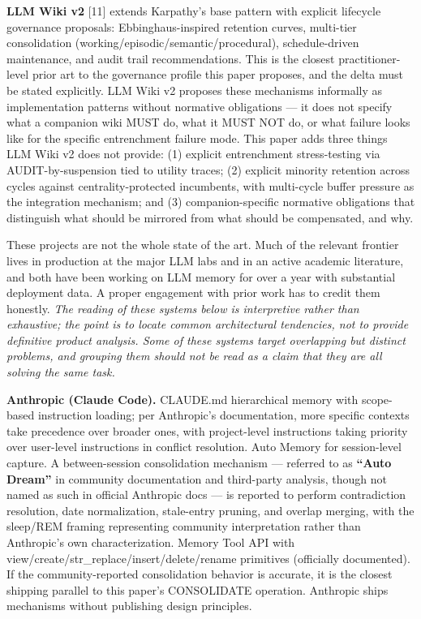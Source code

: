 \documentclass[
  11pt,
]{article}
\begin{document}
\textbf{LLM Wiki v2} {[}11{]} extends Karpathy's base pattern with
explicit lifecycle governance proposals: Ebbinghaus-inspired retention
curves, multi-tier consolidation (working/episodic/semantic/procedural),
schedule-driven maintenance, and audit trail recommendations. This is
the closest practitioner-level prior art to the governance profile this
paper proposes, and the delta must be stated explicitly. LLM Wiki v2
proposes these mechanisms informally as implementation patterns without
normative obligations --- it does not specify what a companion wiki MUST
do, what it MUST NOT do, or what failure looks like for the specific
entrenchment failure mode. This paper adds three things LLM Wiki v2 does
not provide: (1) explicit entrenchment stress-testing via
AUDIT-by-suspension tied to utility traces; (2) explicit minority
retention across cycles against centrality-protected incumbents, with
multi-cycle buffer pressure as the integration mechanism; and (3)
companion-specific normative obligations that distinguish what should be
mirrored from what should be compensated, and why.

These projects are not the whole state of the art. Much of the relevant
frontier lives in production at the major LLM labs and in an active
academic literature, and both have been working on LLM memory for over a
year with substantial deployment data. A proper engagement with prior
work has to credit them honestly. \emph{The reading of these systems
below is interpretive rather than exhaustive; the point is to locate
common architectural tendencies, not to provide definitive product
analysis. Some of these systems target overlapping but distinct
problems, and grouping them should not be read as a claim that they are
all solving the same task.}

\textbf{Anthropic (Claude Code).} CLAUDE.md hierarchical memory with
scope-based instruction loading; per Anthropic's documentation, more
specific contexts take precedence over broader ones, with project-level
instructions taking priority over user-level instructions in conflict
resolution. Auto Memory for session-level capture. A between-session
consolidation mechanism --- referred to as \textbf{``Auto Dream''} in
community documentation and third-party analysis, though not named as
such in official Anthropic docs --- is reported to perform contradiction
resolution, date normalization, stale-entry pruning, and overlap
merging, with the sleep/REM framing representing community
interpretation rather than Anthropic's own characterization. Memory Tool
API with view/create/str\_replace/insert/delete/rename primitives
(officially documented). If the community-reported consolidation
behavior is accurate, it is the closest shipping parallel to this
paper's CONSOLIDATE operation. Anthropic ships mechanisms without
publishing design principles.
\end{document}
